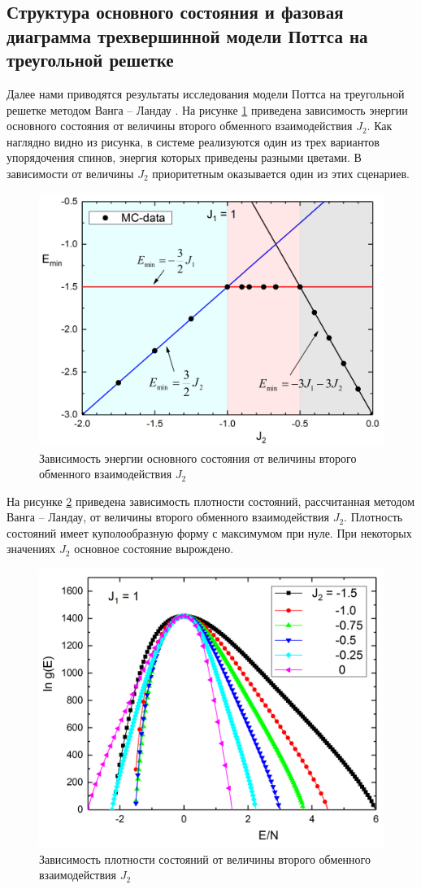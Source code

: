 \subsection{Структура основного состояния и фазовая диаграмма трехвершинной модели Поттса на треугольной решетке}

Далее нами приводятся результаты исследования модели Поттса на треугольной решетке методом Ванга -- Ландау \cite{ph3_4, ph3_5, ph3_6, ph3_7}.
На рисунке \ref{phys3-pic-20} приведена зависимость энергии основного состояния от величины второго обменного взаимодействия $J_2$. Как наглядно видно из рисунка, в системе реализуются один из трех вариантов упорядочения спинов, энергия которых приведены разными цветами. В зависимости от величины $J_2$ приоритетным оказывается один из этих сценариев.

\begin{figure}[H]
	\centering
	\includegraphics[width=0.5\linewidth]{content/sections/images/phys3-2}
	\caption{Зависимость энергии основного состояния от величины второго обменного взаимодействия $J_2$}
\label{phys3-pic-20}
\end{figure}

На рисунке \ref{phys3-pic-30} приведена зависимость плотности состояний, рассчитанная методом Ванга -- Ландау, от величины второго обменного взаимодействия $J_2$. Плотность состояний имеет куполообразную форму с максимумом при нуле. При некоторых значениях $J_2$ основное состояние вырождено.

\begin{figure}[H]
	\centering
	\includegraphics[width=0.5\linewidth]{content/sections/images/phys3-3}
	\caption{Зависимость плотности состояний от величины второго обменного взаимодействия $J_2$}
\label{phys3-pic-30}
\end{figure}

